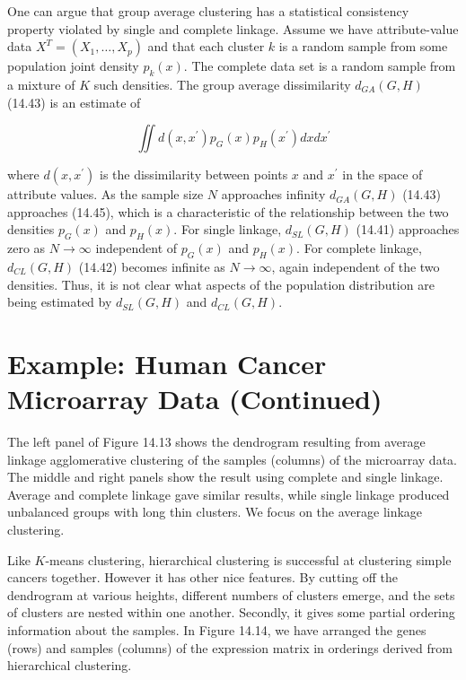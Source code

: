 \documentclass[10pt]{article}
\begin{document}
One can argue that group average clustering has a statistical consistency property violated by single and complete linkage. Assume we have attribute-value data $X^{T}=\left(X_{1}, \ldots, X_{p}\right)$ and that each cluster $k$ is a random sample from some population joint density $p_{k}(x)$. The complete data set is a random sample from a mixture of $K$ such densities. The group average dissimilarity $d_{G A}(G, H)$ (14.43) is an estimate of


\begin{equation*}
\iint d\left(x, x^{\prime}\right) p_{G}(x) p_{H}\left(x^{\prime}\right) d x d x^{\prime} \tag{14.45}
\end{equation*}


where $d\left(x, x^{\prime}\right)$ is the dissimilarity between points $x$ and $x^{\prime}$ in the space of attribute values. As the sample size $N$ approaches infinity $d_{G A}(G, H)$ (14.43) approaches (14.45), which is a characteristic of the relationship between the two densities $p_{G}(x)$ and $p_{H}(x)$. For single linkage, $d_{S L}(G, H)$ (14.41) approaches zero as $N \rightarrow \infty$ independent of $p_{G}(x)$ and $p_{H}(x)$. For complete linkage, $d_{C L}(G, H)$ (14.42) becomes infinite as $N \rightarrow \infty$, again independent of the two densities. Thus, it is not clear what aspects of the population distribution are being estimated by $d_{S L}(G, H)$ and $d_{C L}(G, H)$.

\section*{Example: Human Cancer Microarray Data (Continued)}
The left panel of Figure 14.13 shows the dendrogram resulting from average linkage agglomerative clustering of the samples (columns) of the microarray data. The middle and right panels show the result using complete and single linkage. Average and complete linkage gave similar results, while single linkage produced unbalanced groups with long thin clusters. We focus on the average linkage clustering.

Like $K$-means clustering, hierarchical clustering is successful at clustering simple cancers together. However it has other nice features. By cutting off the dendrogram at various heights, different numbers of clusters emerge, and the sets of clusters are nested within one another. Secondly, it gives some partial ordering information about the samples. In Figure 14.14, we have arranged the genes (rows) and samples (columns) of the expression matrix in orderings derived from hierarchical clustering.
\end{document}
